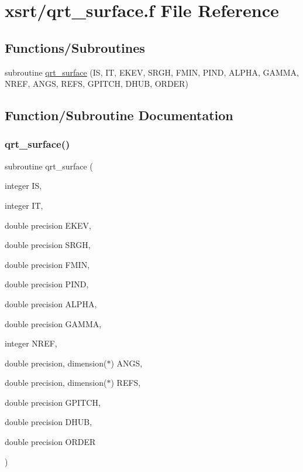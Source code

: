\hypertarget{qrt__surface_8f}{}\section{xsrt/qrt\+\_\+surface.f File Reference}
\label{qrt__surface_8f}
\subsection*{Functions/\+Subroutines}
\begin{DoxyCompactItemize}
\item 
subroutine \hyperlink{qrt__surface_8f_a9a7b51f62da36814c6096b9bc97596c3}{qrt\+\_\+surface} (IS, IT, E\+K\+EV, S\+R\+GH, F\+M\+IN, P\+I\+ND, A\+L\+P\+HA, G\+A\+M\+MA, N\+R\+EF, A\+N\+GS, R\+E\+FS, G\+P\+I\+T\+CH, D\+H\+UB, O\+R\+D\+ER)
\end{DoxyCompactItemize}


\subsection{Function/\+Subroutine Documentation}
\mbox{\label{qrt__surface_8f_a9a7b51f62da36814c6096b9bc97596c3}} 
\subsubsection{\texorpdfstring{qrt\+\_\+surface()}{qrt\_surface()}}
{\footnotesize\ttfamily subroutine qrt\+\_\+surface (\begin{DoxyParamCaption}\item[{integer}]{IS,  }\item[{integer}]{IT,  }\item[{double precision}]{E\+K\+EV,  }\item[{double precision}]{S\+R\+GH,  }\item[{double precision}]{F\+M\+IN,  }\item[{double precision}]{P\+I\+ND,  }\item[{double precision}]{A\+L\+P\+HA,  }\item[{double precision}]{G\+A\+M\+MA,  }\item[{integer}]{N\+R\+EF,  }\item[{double precision, dimension($\ast$)}]{A\+N\+GS,  }\item[{double precision, dimension($\ast$)}]{R\+E\+FS,  }\item[{double precision}]{G\+P\+I\+T\+CH,  }\item[{double precision}]{D\+H\+UB,  }\item[{double precision}]{O\+R\+D\+ER }\end{DoxyParamCaption})}

